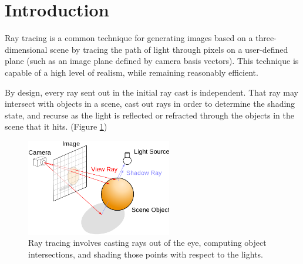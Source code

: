 \documentclass{acmsiggraph}                     %
\begin{document}

\begin{CRcatlist}
\end{CRcatlist}

\keywordlist

\section{Introduction}
\label{sec:intro}

    Ray tracing is a common technique for generating images based on a three-dimensional scene by 
    tracing the path of light through pixels on a user-defined plane (such as an image plane 
    defined by camera basis vectors). This technique is capable of a high level of realism, while 
    remaining reasonably efficient.

    By design, every ray sent out in the initial ray cast is independent. That ray may intersect 
    with objects in a scene, cast out rays in order to determine the shading state, and recurse as 
    the light is reflected or refracted through the objects in the scene that it hits. (Figure
    \ref{fig:diagram})
    
    \begin{figure}[htb]
        \begin{center}
            \leavevmode
            \includegraphics[width=2.5in]{diagram.png}
        \end{center}
        \caption{Ray tracing involves casting rays out of the eye, computing object intersections,
            and shading those points with respect to the lights.}
        \label{fig:diagram}
    \end{figure}
\end{document}
